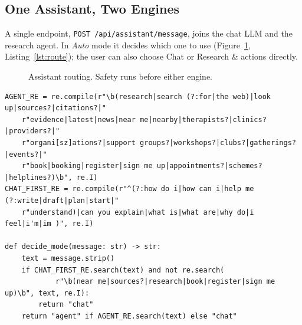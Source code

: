 \documentclass[11pt,a4paper]{article}
\newcommand{\code}[1]{\texttt{#1}}
\begin{document}
\subsection{One Assistant, Two Engines}
A single endpoint, \code{POST /api/assistant/message}, joins the chat LLM and the research agent.
In \emph{Auto} mode it decides which one to use (Figure~\ref{fig:routing}, Listing~\ref{lst:route});
the user can also choose Chat or Research \& actions directly.

\begin{figure}[H]
\centering
{}
\caption{Assistant routing. Safety runs before either engine.}
\label{fig:routing}
\end{figure}

\par\noindent\begin{minipage}{\linewidth}\begin{lstlisting}[caption={Auto-routing between chat and the agent (\code{nbapp/assistant.py}, shortened).},label={lst:route}]
AGENT_RE = re.compile(r"\b(research|search (?:for|the web)|look up|sources?|citations?|"
    r"evidence|latest|news|near me|nearby|therapists?|clinics?|providers?|"
    r"organi[sz]ations?|support groups?|workshops?|clubs?|gatherings?|events?|"
    r"book|booking|register|sign me up|appointments?|schemes?|helplines?)\b", re.I)
CHAT_FIRST_RE = re.compile(r"^(?:how do i|how can i|help me (?:write|draft|plan|start|"
    r"understand)|can you explain|what is|what are|why do|i feel|i'm|im )", re.I)

def decide_mode(message: str) -> str:
    text = message.strip()
    if CHAT_FIRST_RE.search(text) and not re.search(
            r"\b(near me|sources?|research|book|register|sign me up)\b", text, re.I):
        return "chat"
    return "agent" if AGENT_RE.search(text) else "chat"
\end{lstlisting}\end{minipage}\par
\end{document}
